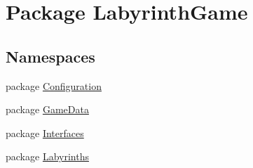 \hypertarget{namespace_labyrinth_game}{\section{Package Labyrinth\+Game}
\label{namespace_labyrinth_game}
}
\subsection*{Namespaces}
\begin{DoxyCompactItemize}
\item 
package \hyperlink{namespace_labyrinth_game_1_1_configuration}{Configuration}
\item 
package \hyperlink{namespace_labyrinth_game_1_1_game_data}{Game\+Data}
\item 
package \hyperlink{namespace_labyrinth_game_1_1_interfaces}{Interfaces}
\item 
package \hyperlink{namespace_labyrinth_game_1_1_labyrinths}{Labyrinths}
\end{DoxyCompactItemize}
